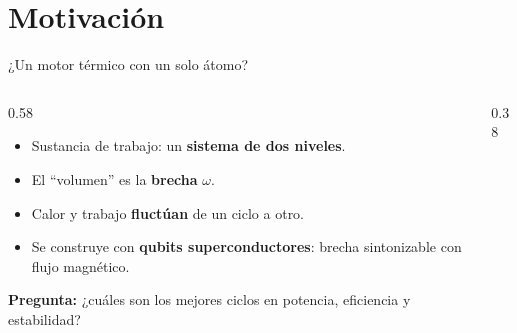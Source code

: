 \section{Motivación}

\begin{frame}{¿Un motor térmico con un solo átomo?}
    \begin{columns}[c]
        \begin{column}{0.58\textwidth}
            \begin{itemize}
                \setlength{\itemsep}{6pt}
                \item Sustancia de trabajo: un \textbf{sistema de dos niveles}.
                \item El ``volumen'' es la \textbf{brecha} $\omega$.
                \item Calor y trabajo \textbf{fluctúan} de un ciclo a otro.
                \item Se construye con \textbf{qubits superconductores}: brecha sintonizable con flujo magnético.
            \end{itemize}

            \vspace{10pt}
            \textbf{Pregunta:} ¿cuáles son los mejores ciclos en potencia, eficiencia y estabilidad?
        \end{column}
        \begin{column}{0.38\textwidth}
            \centering
        \end{column}
    \end{columns}
\end{frame}
